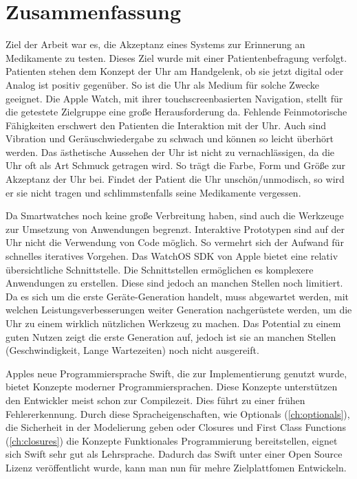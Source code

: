 \section{Zusammenfassung}
Ziel der Arbeit war es, die Akzeptanz eines Systems zur Erinnerung an Medikamente zu testen. Dieses Ziel wurde mit einer Patientenbefragung verfolgt. Patienten stehen dem Konzept der Uhr am Handgelenk, ob sie jetzt digital oder Analog ist positiv gegenüber. So ist die Uhr als Medium für solche Zwecke geeignet. Die Apple Watch, mit ihrer touchscreenbasierten Navigation, stellt für die getestete Zielgruppe eine große Herausforderung da. Fehlende Feinmotorische Fähigkeiten erschwert den Patienten die Interaktion mit der Uhr. Auch sind Vibration und Geräuschwiedergabe zu schwach und können so leicht überhört werden. Das ästhetische Aussehen der Uhr ist nicht zu vernachlässigen, da die Uhr oft als Art Schmuck getragen wird. So trägt die Farbe, Form und Größe zur Akzeptanz der Uhr bei. Findet der Patient die Uhr unschön/unmodisch, so wird er sie nicht tragen und schlimmstenfalls seine Medikamente vergessen.

Da Smartwatches noch keine große Verbreitung haben, sind auch die Werkzeuge zur Umsetzung von Anwendungen begrenzt. Interaktive Prototypen sind auf der Uhr nicht die Verwendung von Code möglich. So vermehrt sich der Aufwand für schnelles iteratives Vorgehen. Das WatchOS SDK von Apple bietet eine relativ übersichtliche Schnittstelle. Die Schnittstellen ermöglichen es komplexere Anwendungen zu erstellen. Diese sind jedoch an manchen Stellen noch limitiert. Da es sich um die erste Geräte-Generation handelt, muss abgewartet werden, mit welchen Leistungsverbesserungen weiter Generation nachgerüstete werden, um die Uhr zu einem wirklich nützlichen Werkzeug zu machen. Das Potential zu einem guten Nutzen zeigt die erste Generation auf, jedoch ist sie an manchen Stellen (Geschwindigkeit, Lange Wartezeiten) noch nicht ausgereift.

Apples neue Programmiersprache Swift, die zur Implementierung genutzt wurde, bietet Konzepte moderner Programmiersprachen. Diese Konzepte unterstützen den Entwickler meist schon zur Compilezeit. Dies führt zu einer frühen Fehlererkennung. Durch diese Spracheigenschaften, wie Optionals (\ref{ch:optionals}), die Sicherheit in der Modelierung geben oder Closures und First Class Functions (\ref{ch:closures}) die Konzepte Funktionales Programmierung bereitstellen, eignet sich Swift sehr gut als Lehrsprache. Dadurch das Swift unter einer Open Source Lizenz veröffentlicht wurde, kann man nun für mehre Zielplattfomen Entwickeln.

